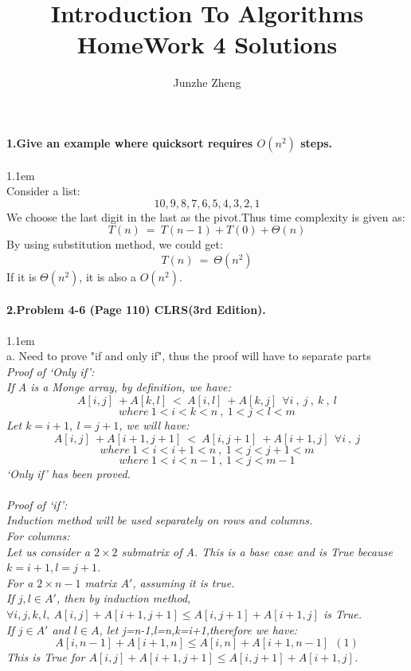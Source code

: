 \documentclass[11pt]{article}
\title{Introduction To Algorithms \\ HomeWork 4 Solutions}
\author{Junzhe Zheng}
\begin{document}
\maketitle

\paragraph{1.Give an example where quicksort requires $O(n^{2})$ steps.}
\hangindent 1.1em
\noindent
\\Consider a list:
\[
	10,9,8,7,6,5,4,3,2,1
\]
We choose the last digit in the last as the pivot.Thus time complexity is given as:
\[
	T(n)\ =\ T(n-1)+T(0)+\Theta(n)
\]
By using substitution method, we could get:
\[
	T(n)\ =\ \Theta(n^{2})
\]
If it is $\Theta(n^{2})$, it is also a $O(n^{2})$.
\\
\paragraph{2.Problem 4-6 (Page 110) CLRS(3rd Edition).}
\hangindent 1.1em
\noindent
\\a. Need to prove "if and only if", thus the proof will have to separate parts
\\\it{ Proof of `Only if'}\normalfont:
\\If A is a Monge array, by definition, we have:
$$A[i,j]\ +A[k,l]\ <\ A[i,l]\ +A[k,j]\ \ \forall i\ ,\ j\ ,\ k\ ,\ l$$
$$where\ 1<i<k<n\ ,\ 1<j<l<m$$
Let $k=i+1,\ l=j+1$, we will have:
$$A[i,j]\ +A[i+1,j+1]\ <\ A[i,j+1]\ +A[i+1,j]\ \ \forall i\ ,\ j$$
$$where\ 1<i<i+1<n\ ,\ 1<j<j+1<m$$
$$where\ 1<i<n-1\ ,\ 1<j<m-1$$
`Only if' has been proved.
\\
\\\it{Proof of `if'}\normalfont:
\\Induction method will be used separately on rows and columns.
\\For columns:
\\Let us consider a $2 \times 2$ submatrix  of A. This is a base case and is True because $k = i+1, l = j + 1$.
\\For a $2 \times n-1$ matrix $A'$, assuming it is true.
\\If $j,l \in A'$, then by induction method, $\forall i,j,k,l,\ A[i,j]+A[i+1,j+1]\leq A[i,j+1]+A[i+1,j]$ is True.
\\If $j\in A'$ and $l\in A$, let j=n-1,l=n,k=i+1,therefore we have:
$$A[i,n-1]+A[i+1,n]\leq A[i,n]+A[i+1,n-1]\ \ (1)$$
This is True for $A[i,j]+A[i+1,j+1]\leq A[i,j+1]+A[i+1,j]$.
\end{document}

